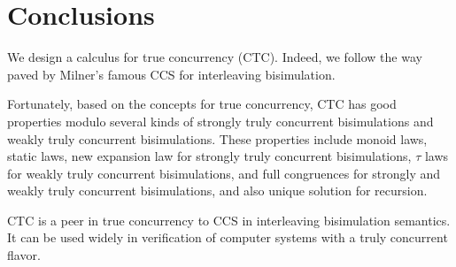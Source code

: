 \section{Conclusions}\label{con}

We design a calculus for true concurrency (CTC). Indeed, we follow the way paved by Milner's famous CCS \cite{CCS} \cite{CC} for interleaving bisimulation.

Fortunately, based on the concepts for true concurrency, CTC has good properties modulo several kinds of strongly truly concurrent bisimulations and weakly truly concurrent bisimulations. These properties include monoid laws, static laws, new expansion law for strongly truly concurrent bisimulations, $\tau$ laws for weakly truly concurrent bisimulations, and full congruences for strongly and weakly truly concurrent bisimulations, and also unique solution for recursion.

CTC is a peer in true concurrency to CCS in interleaving bisimulation semantics. It can be used widely in verification of computer systems with a truly concurrent flavor. 